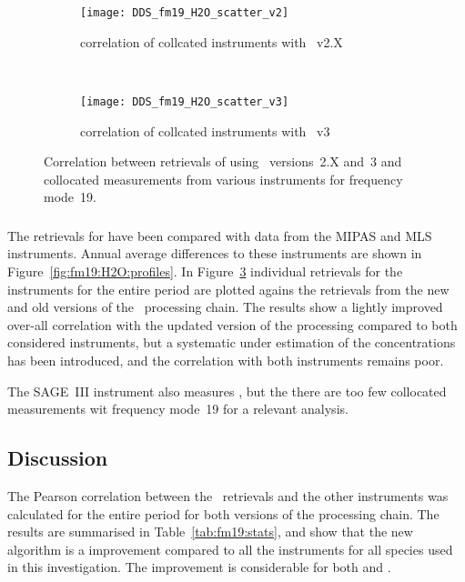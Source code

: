 \begin{figure}[htpb]
    \centering
    \begin{subfigure}[b]{0.49\textwidth}
        \texttt{[image: DDS\_fm19\_H2O\_scatter\_v2]}
        \caption{correlation of collcated instruments with \smr~v2.X}
        \label{fig:fm19:H2O:scatter:v2}
    \end{subfigure}
    \,
    \begin{subfigure}[b]{0.49\textwidth}
        \texttt{[image: DDS\_fm19\_H2O\_scatter\_v3]}
        \caption{correlation of collcated instruments with \smr~v3}
        \label{fig:fm19:H2O:scatter:v3}
    \end{subfigure}
    \caption{Correlation between retrievals of  using \smr\
    versions~2.X and~3 and collocated measurements from various instruments
    for frequency mode~19.}
    \label{fig:fm19:H2O:scatter}
\end{figure}

\subsubsection{}
\label{sec:fm19:comparison:H2O}
The retrievals for \chem{H_2O} have been compared with data from the MIPAS and
MLS instruments.  Annual average differences to these instruments are shown in
Figure~\ref{fig:fm19:H2O:profiles}. In Figure~\ref{fig:fm19:H2O:scatter}
individual retrievals for the instruments for the entire period are plotted
agains the retrievals from the new and old versions of the \smr\ processing
chain. The results show a lightly improved over-all correlation with the
updated version of the processing compared to both considered instruments, but
a systematic under estimation of the concentrations has been introduced, and
the correlation with both instruments remains poor.

The SAGE~III instrument also measures , but the there are too few
collocated measurements wit frequency mode~19 for a relevant analysis.


\subsubsection{}
\label{sec:fm19:comparison:temperature}


\subsection{Discussion}
\label{sec:fm19:discussion}
The Pearson correlation between the \smr\ retrievals and the other instruments
was calculated for the entire period for both versions of the processing chain.
The results are summarised in Table~\ref{tab:fm19:stats}, and show that the
new algorithm is a improvement compared to all the instruments for all species
used in this investigation. The improvement is considerable for both \chem{O_3}
and \chem{H_2O}.


